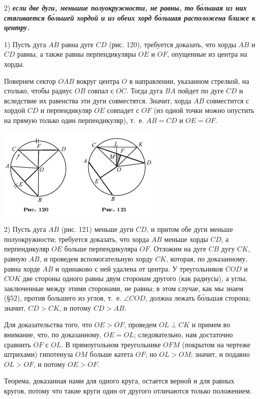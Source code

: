\documentclass[oneside]{book}
\begin{document}
2) \textbf{\emph{если две дуги, меньшие полуокружности, не равны, то б\'{о}льшая из них стягивается б\'{о}льшей хордой и из обеих хорд б\'{о}льшая расположена ближе к центру.}}

1) Пусть дуга $AB$ равна дуге $CD$ (рис. 120), требуется доказать, что хорды $AB$ и $CD$ равны, а также равны перпендикуляры $OE$ и $OF$, опущенные из центра на хорды.

Повернем сектор $OAB$ вокруг центра $O$ в направлении, указанном стрелкой, на столько, чтобы радиус $OB$ совпал с $OC$.
Тогда дуга $BA$ пойдет по дуге $CD$ и вследствие их равенства эти дуги совместятся.
Значит, хорда $AB$ совместится с хордой $CD$ и перпендикуляр $OE$ совпадет с $OF$ (из одной точки можно опустить на прямую только один перпендикуляр), т.~е.
$AB=CD$ и $OE=OF$.

\includegraphics{pics/ris-120-121}

2) Пусть дуга $AB$ (рис. 121) меньше дуги $CD$, и притом обе дуги меньше полуокружности;
требуется доказать, что хорда $AB$ меньше хорды $CD$, а перпендикуляр $OE$ больше перпендикуляра $OF$.
Отложим на дуге $CB$ дугу $CK$, равную $AB$, и проведем вспомогательную хорду $CK$, которая, по доказанному, равна хорде $AB$ и одинаково с ней удалена от центра.
У треугольников $COD$ и $COK$ две стороны одного равны двум сторонам другого (как радиусы), а углы, заключенные между этими сторонами, не равны;
в этом случае, как мы знаем (§52), против большего из углов, т.~е.
$\angle COD$, должна лежать б\'{о}льшая сторона;
значит, $CD>CK$, и потому $CD>AB$.

Для доказательства того, что $OE>OF$, проведем $OL\perp CK$ и примем во внимание, что, по доказанному, $OE=OL$;
следовательно, нам достаточно сравнить $OF$ с $OL$.
В прямоугольном треугольнике $OFM$ (покрытом на чертеже штрихами) гипотенуза $OM$ больше катета $OF$;
но $OL>OM$;
значит, и подавно $OL>OF$, и потому $OE>OF$.

Теорема, доказанная нами для одного круга, остается верной и для равных кругов, потому что такие круги один от другого отличаются только положением.
\end{document}
